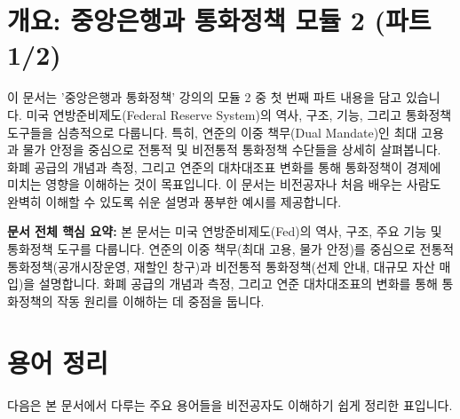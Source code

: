 \documentclass[11pt,a4paper]{article}
\begin{document}
\newpage
\section*{개요: 중앙은행과 통화정책 모듈 2 (파트 1/2)}

이 문서는 '중앙은행과 통화정책' 강의의 모듈 2 중 첫 번째 파트 내용을 담고 있습니다.
미국 연방준비제도(Federal Reserve System)의 역사, 구조, 기능, 그리고 통화정책 도구들을 심층적으로 다룹니다.
특히, 연준의 이중 책무(Dual Mandate)인 최대 고용과 물가 안정을 중심으로 전통적 및 비전통적 통화정책 수단들을 상세히 살펴봅니다.
화폐 공급의 개념과 측정, 그리고 연준의 대차대조표 변화를 통해 통화정책이 경제에 미치는 영향을 이해하는 것이 목표입니다.
이 문서는 비전공자나 처음 배우는 사람도 완벽히 이해할 수 있도록 쉬운 설명과 풍부한 예시를 제공합니다.

\vspace{1em}

\begin{summarybox}
\textbf{문서 전체 핵심 요약:}
본 문서는 미국 연방준비제도(Fed)의 역사, 구조, 주요 기능 및 통화정책 도구를 다룹니다.
연준의 이중 책무(최대 고용, 물가 안정)를 중심으로 전통적 통화정책(공개시장운영, 재할인 창구)과 비전통적 통화정책(선제 안내, 대규모 자산 매입)을 설명합니다.
화폐 공급의 개념과 측정, 그리고 연준 대차대조표의 변화를 통해 통화정책의 작동 원리를 이해하는 데 중점을 둡니다.
\end{summarybox}

\newpage
\tableofcontents
\newpage

\section{용어 정리}

다음은 본 문서에서 다루는 주요 용어들을 비전공자도 이해하기 쉽게 정리한 표입니다.
\end{document}
